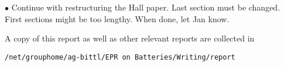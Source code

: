 \documentclass[12pt,a4paper]{report}
\newcommand{\sectionline}[2]{%
  \nointerlineskip \vspace{.5\baselineskip}\hspace{\fill}
  {\color{#1}
    \resizebox{0.5\linewidth}{2ex}
    {{%
    {\begin{tikzpicture}
    \node  (C) at (0,0) {};
    \node (D) at (9,0) {};
    \path (C) to [ornament=#2] (D);
    \end{tikzpicture}}}}}%
    \hspace{\fill}
    \par\nointerlineskip \vspace{.5\baselineskip}
  }
\begin{document}
$\bullet$ Continue with restructuring the Hall paper. Last section must be changed. First sections might be too lengthy. When done, let Jan know.\\


\par A copy of this report as well as other relevant reports are collected in \begin{verbatim}
/net/grouphome/ag-bittl/EPR on Batteries/Writing/report
\end{verbatim} 



\end{document}
